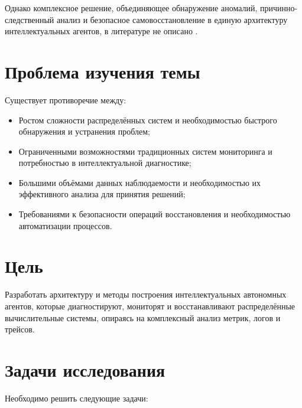 Однако комплексное решение, объединяющее обнаружение аномалий, причинно-следственный анализ и безопасное самовосстановление в единую архитектуру интеллектуальных агентов, в литературе не описано \cite{aiops_survey}.

\section*{Проблема изучения темы}

Существует противоречие между:
\begin{itemize}
    \item Ростом сложности распределённых систем и необходимостью быстрого обнаружения и устранения проблем;
    \item Ограниченными возможностями традиционных систем мониторинга и потребностью в интеллектуальной диагностике;
    \item Большими объёмами данных наблюдаемости и необходимостью их эффективного анализа для принятия решений;
    \item Требованиями к безопасности операций восстановления и необходимостью автоматизации процессов.
\end{itemize}

\section*{Цель}

Разработать архитектуру и методы построения интеллектуальных автономных агентов, которые диагностируют, мониторят и восстанавливают распределённые вычислительные системы, опираясь на комплексный анализ метрик, логов и трейсов.

\section*{Задачи исследования}

Необходимо решить следующие задачи:

